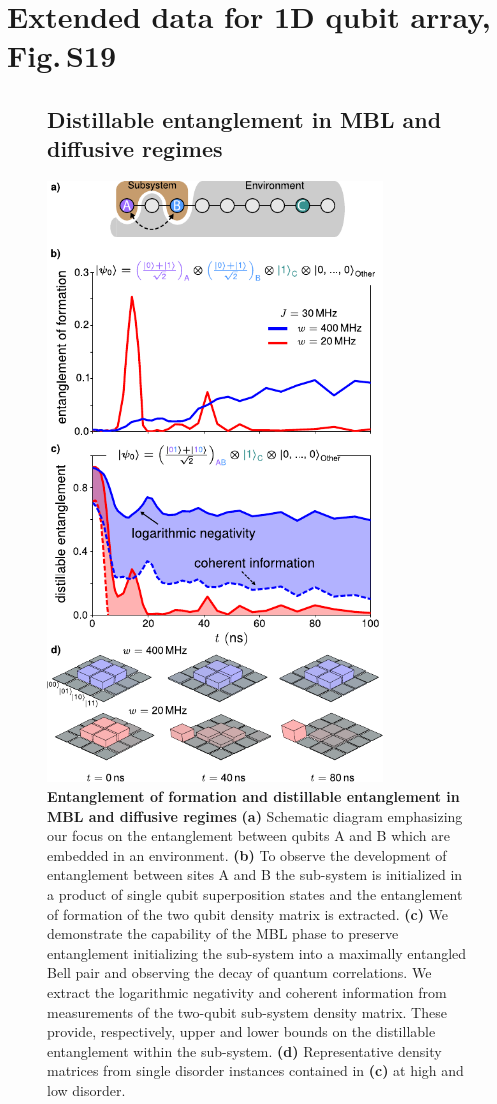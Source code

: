 \section{Extended data for 1D qubit array, Fig.\,S19}
\begin{figure}[h]
\subsection{Distillable entanglement in MBL and diffusive regimes}
\centering
\includegraphics[width=89mm, keepaspectratio]{./PDF/f6_190716_1129a.pdf}
\caption{\textbf{Entanglement of formation and distillable entanglement in MBL and diffusive regimes}
        \textbf{(a)} Schematic diagram emphasizing our focus on the entanglement between qubits A and B which are embedded in an environment.
        \textbf{(b)} To observe the development of entanglement between sites A and B the sub-system is initialized in a product of single qubit superposition states and the entanglement of formation of the two qubit density matrix is extracted.
        \textbf{(c)} We demonstrate the capability of the MBL phase to preserve entanglement initializing the sub-system into a maximally entangled Bell pair and observing the decay of quantum correlations.
        We extract the logarithmic negativity and coherent information from measurements of the two-qubit sub-system density matrix.
        These provide, respectively, upper and lower bounds on the distillable entanglement within the sub-system.
        \textbf{(d)} Representative density matrices from single disorder instances contained in \textbf{(c)} at high and low disorder.
        }

\end{figure}

